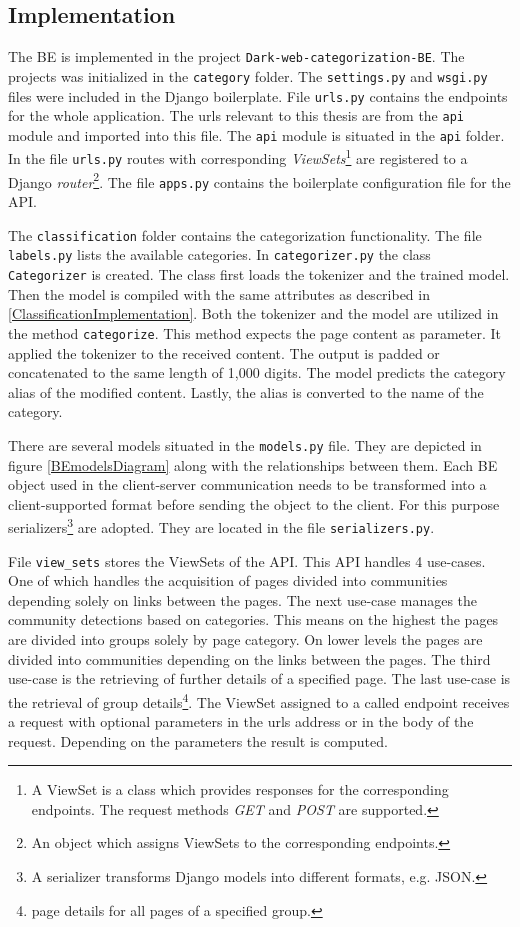 \subsection{Implementation} \label{APIImplementation}
The BE is implemented in the project \texttt{Dark-web-categorization-BE}. The projects was initialized in the \texttt{category} folder. The \texttt{settings.py} and \texttt{wsgi.py} files were included in the Django boilerplate. File \texttt{urls.py} contains the endpoints for the whole application. The urls relevant to this thesis are from the \texttt{api} module and imported into this file.
The \texttt{api} module is situated in the \texttt{api} folder. In the file \texttt{urls.py} routes with corresponding \textit{ViewSets}\footnote{A ViewSet is a class which provides responses for the corresponding endpoints. The request methods \textit{GET} and \textit{POST} are supported.} are registered to a Django \textit{router}\footnote{An object which assigns ViewSets to the corresponding endpoints.}. The file \texttt{apps.py} contains the boilerplate configuration file for the API. 

The \texttt{classification} folder contains the categorization functionality. The file \texttt{labels.py} lists the available categories. In \texttt{categorizer.py} the class \texttt{Categorizer} is created. The class first loads the tokenizer and the trained model. Then the model is compiled with the same attributes as described in \ref{ClassificationImplementation}. Both the tokenizer and the model are utilized in the method \texttt{categorize}. This method expects the page content as parameter. It applied the tokenizer to the received content. The output is padded or concatenated to the same length of 1,000 digits. The model predicts the category alias of the modified content. Lastly, the alias is converted to the name of the category.

There are several models situated in the \texttt{models.py} file. They are depicted in figure \ref{BEmodelsDiagram} along with the relationships between them. Each BE object used in the client-server communication needs to be transformed into a client-supported format before sending the object to the client. For this purpose serializers\footnote{A serializer transforms Django models into different formats, e.g. JSON.} are adopted. They are located in the file \texttt{serializers.py}.

File \texttt{view\_sets} stores the ViewSets of the API. This API handles 4 use-cases. One of which handles the acquisition of pages divided into communities depending solely on links between the pages. The next use-case manages the community detections based on categories. This means on the highest the pages are divided into groups solely by page category. On lower levels the pages are divided into communities depending on the links between the pages. The third use-case is the retrieving of further details of a specified page. The last use-case is the retrieval of group details\footnote{page details for all pages of a specified group.}. The ViewSet assigned to a called endpoint receives a request with optional parameters in the urls address or in the body of the request. Depending on the parameters the result is computed. 

